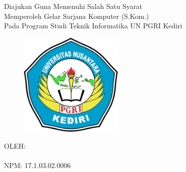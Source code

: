 \begin{titlepage}
    \begin{center}
        \\
        \vspace{3em}
        \\
        Diajukan Guna Memenuhi Salah Satu Syarat\\
        Memperoleh Gelar Sarjana Komputer (S.Kom.)\\
        Pada Program Studi Teknik Informatika UN PGRI Kediri\\
        \vspace{3em}
        \begin{figure}
            \begin{center}
                \includegraphics[width=5cm]{assets/pics/unp-logo.png}
            \end{center}
        \end{figure}
        \vspace{3em}
        OLEH:\\
        \vspace{1em}
        \\
        NPM: 17.1.03.02.0006\\
        \vspace{8em}
    \end{center}
\end{titlepage}
\newpage
